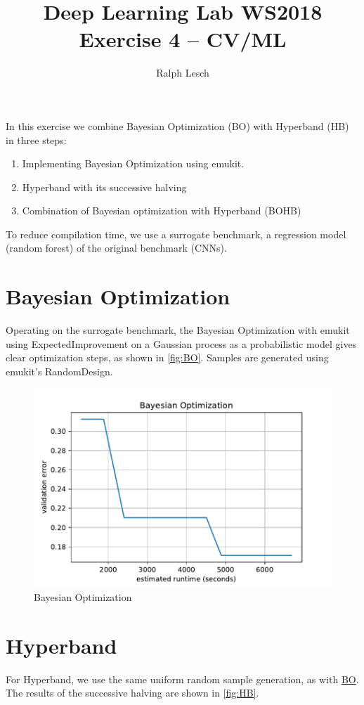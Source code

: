 \documentclass[11pt,a4paper,DIV=14,headinclude=false,footinclude=false]{scrartcl}
\begin{document}
\title{Deep Learning Lab WS2018\\Exercise 4 -- CV/ML}
\author{Ralph Lesch}
\maketitle

\noindent In this exercise we combine Bayesian Optimization (BO) with Hyperband (HB) in three steps:
\begin{enumerate}
\item Implementing Bayesian Optimization using emukit.
\item Hyperband with its successive halving
\item Combination of Bayesian optimization with Hyperband (BOHB)
\end{enumerate}
To reduce compilation time, we use a surrogate benchmark, a regression model (random forest) of the original benchmark (CNNs).
\section{Bayesian Optimization}\label{sec:BO}
Operating on the surrogate benchmark, the Bayesian Optimization with emukit using ExpectedImprovement on a Gaussian process as a probabilistic model gives clear optimization steps, as shown in \autoref{fig:BO}. Samples are generated using emukit's RandomDesign.
\begin{figure}[hb]\centering
	\includegraphics[width=.6\linewidth]{plots/BO.pdf}
	\caption{Bayesian Optimization}\label{fig:BO}
\end{figure}

\section{Hyperband}
For Hyperband, we use the same uniform random sample generation, as with \hyperref[sec:BO]{BO}. The results of the successive halving are shown in \autoref{fig:HB}.
\end{document}
